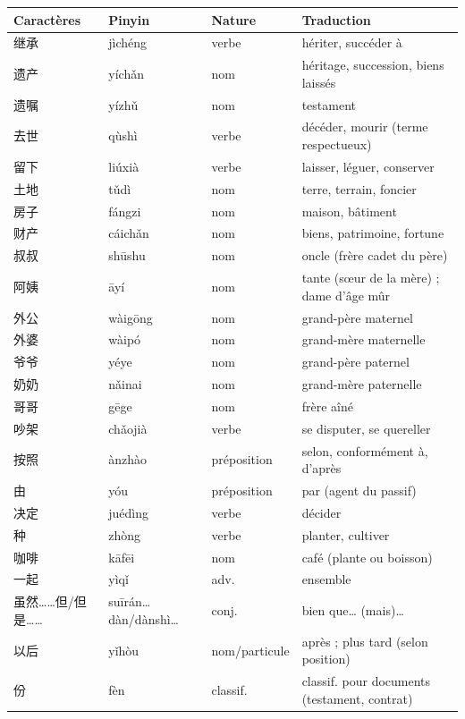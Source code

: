 \documentclass[11pt]{article}
\begin{document}
\begin{center}
\begin{tabularx}{\linewidth}{|X|X|X|X|}
\hline
\rowcolor{popblueL} Caractères & Pinyin & Nature & Traduction \\
\hline
继承 & jìchéng & verbe & hériter, succéder à \\
\hline
遗产 & yíchǎn & nom & héritage, succession, biens laissés \\
\hline
遗嘱 & yízhǔ & nom & testament \\
\hline
去世 & qùshì & verbe & décéder, mourir (terme respectueux) \\
\hline
留下 & liúxià & verbe & laisser, léguer, conserver \\
\hline
土地 & tǔdì & nom & terre, terrain, foncier \\
\hline
房子 & fángzi & nom & maison, bâtiment \\
\hline
财产 & cáichǎn & nom & biens, patrimoine, fortune \\
\hline
叔叔 & shūshu & nom & oncle (frère cadet du père) \\
\hline
阿姨 & āyí & nom & tante (sœur de la mère) ; dame d'âge mûr \\
\hline
外公 & wàigōng & nom & grand-père maternel \\
\hline
外婆 & wàipó & nom & grand-mère maternelle \\
\hline
爷爷 & yéye & nom & grand-père paternel \\
\hline
奶奶 & nǎinai & nom & grand-mère paternelle \\
\hline
哥哥 & gēge & nom & frère aîné \\
\hline
吵架 & chǎojià & verbe & se disputer, se quereller \\
\hline
按照 & ànzhào & préposition & selon, conformément à, d'après \\
\hline
由 & yóu & préposition & par (agent du passif) \\
\hline
决定 & juédìng & verbe & décider \\
\hline
种 & zhòng & verbe & planter, cultiver \\
\hline
咖啡 & kāfēi & nom & café (plante ou boisson) \\
\hline
一起 & yìqǐ & adv. & ensemble \\
\hline
虽然……但/但是…… & suīrán… dàn/dànshì… & conj. & bien que… (mais)… \\
\hline
以后 & yǐhòu & nom/particule & après ; plus tard (selon position) \\
\hline
份 & fèn & classif. & classif. pour documents (testament, contrat) \\
\hline
\end{tabularx}
\end{center}
\end{document}
